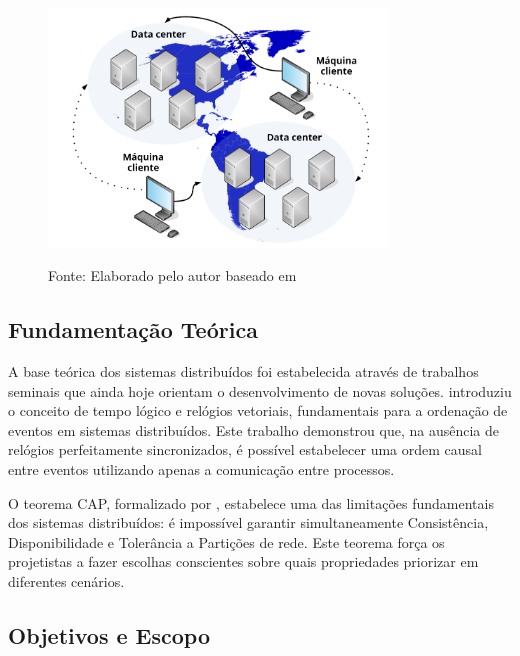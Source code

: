 \begin{figure}[H]
\centering
{}
\includegraphics[width=0.8\textwidth]{figure/sistema-distribuido.png}

\label{fig:arquitetura_distribuida}
{\fontsize{10pt}{\baselineskip}\selectfont
  Fonte: Elaborado pelo autor baseado em }
\end{figure}

\subsection{Fundamentação Teórica}

A base teórica dos sistemas distribuídos foi estabelecida através de trabalhos seminais que ainda hoje orientam o desenvolvimento de novas soluções.  introduziu o conceito de tempo lógico e relógios vetoriais, fundamentais para a ordenação de eventos em sistemas distribuídos. Este trabalho demonstrou que, na ausência de relógios perfeitamente sincronizados, é possível estabelecer uma ordem causal entre eventos utilizando apenas a comunicação entre processos.

O teorema CAP, formalizado por , estabelece uma das limitações fundamentais dos sistemas distribuídos: é impossível garantir simultaneamente Consistência, Disponibilidade e Tolerância a Partições de rede. Este teorema força os projetistas a fazer escolhas conscientes sobre quais propriedades priorizar em diferentes cenários.

\subsection{Objetivos e Escopo}

